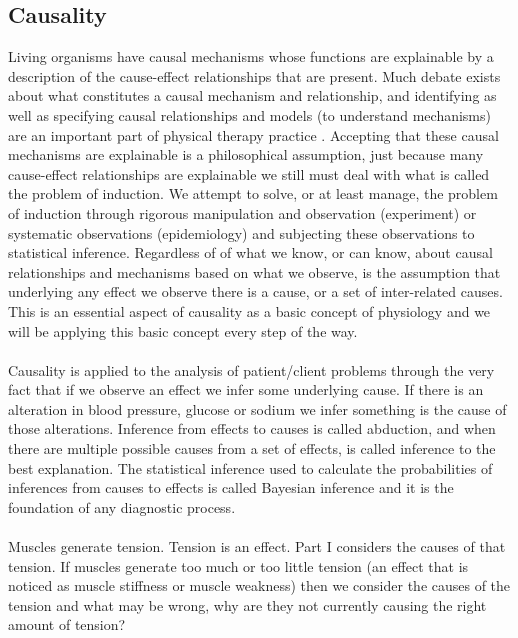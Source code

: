 \subsection{Causality}
Living organisms have causal mechanisms whose functions are explainable by a description of the cause-effect relationships that are present. Much debate exists about what constitutes a causal mechanism and relationship, and identifying as well as specifying causal relationships and models (to understand mechanisms) are an important part of physical therapy practice \cite{collins_synthesis_2018}. Accepting that these causal mechanisms are explainable is a philosophical assumption, just because many cause-effect relationships are explainable we still must deal with what is called the problem of induction. We attempt to solve, or at least manage, the problem of induction through rigorous manipulation and observation (experiment) or systematic observations (epidemiology) and subjecting these observations to statistical inference. Regardless of of what we know, or can know, about causal relationships and mechanisms based on what we observe, is the assumption that underlying any effect we observe there is a cause, or a set of inter-related causes. This is an essential aspect of causality as a basic concept of physiology and we will be applying this basic concept every step of the way.
\paragraph{}
Causality is applied to the analysis of patient/client problems through the very fact that if we observe an effect we infer some underlying cause. If there is an alteration in blood pressure, glucose or sodium we infer something is the cause of those alterations. Inference from effects to causes is called abduction, and when there are multiple possible causes from a set of effects, is called inference to the best explanation. The statistical inference used to calculate the probabilities of inferences from causes to effects is called Bayesian inference and it is the foundation of any diagnostic process. 
\paragraph{}
Muscles generate tension. Tension is an effect. Part I considers the causes of that tension. If muscles generate too much or too little tension (an effect that is noticed as muscle stiffness or muscle weakness) then we consider the causes of the tension and what may be wrong, why are they not currently causing the right amount of tension? 

